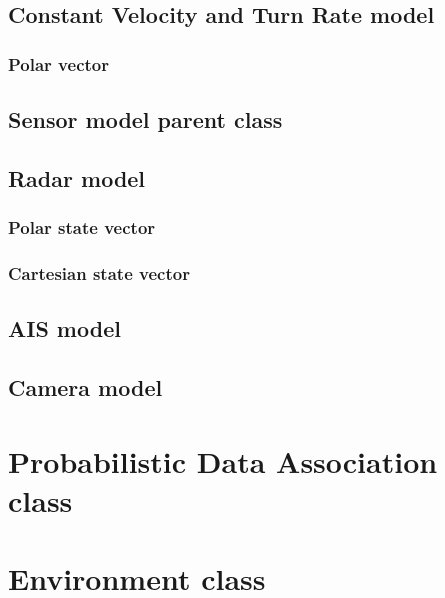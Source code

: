 \subsection{Constant Velocity and Turn Rate model}
\subsubsection{Polar \boatspeed vector}

\subsection{Sensor model parent class}

\subsection{Radar model}
\subsubsection{Polar \boatspeed state vector}

\subsubsection{Cartesian \boatspeed state vector}

\subsection{AIS model}

\subsection{Camera model}





\section{Probabilistic Data Association class}

\section{Environment class}

